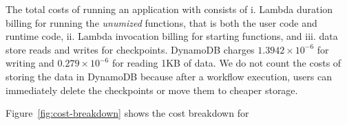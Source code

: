 The total costs of running an application with \name{} consists of i. Lambda
duration billing for running the \emph{unumized} functions, that is both the
user code and \name{} runtime code, ii. Lambda invocation billing for starting
functions, and iii. data store reads and writes for checkpoints. DynamoDB
charges $1.3942 \times 10^{-6}$ for writing and $0.279
\times 10^{-6}$ for reading 1KB of data. We do not count the costs of storing
the data in DynamoDB because after a workflow execution, users can immediately
delete the checkpoints or move them to cheaper storage.

Figure~\ref{fig:cost-breakdown} shows the cost breakdown for 














